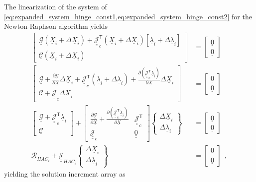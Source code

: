 \documentclass[12pt,a4paper,oneside,english]{abntex2} %
\newcommand{\vect}[1]{\underline{#1}}
\newcommand{\del}[2]{\frac{\partial#1}{\partial#2}}
\def\tens#1{\underline{\underline{#1}}}
\def\lb{\left[}
\def\rb{\right]}
\def\lp{\left(}
\def\rp{\right)}
\def\T{\mathsf{T}}
\def\zv{\vect{0}}
\def\Sys{\mathcal{\vect{G}}}
\def\X{\vect{X}}
\def\Xi{\X_i}
\def\JacSys{\tens{\mathcal{J}}}
\def\lambvi{\vect{\lambda}_i}
\begin{document}
The linearization of the system of \cref{eq:expanded_system_hinge_const1,eq:expanded_system_hinge_const2} for the Newton-Raphson algorithm yields
\begin{align}
    \begin{bmatrix} 
    \Sys\lp\Xi+\Delta\Xi\rp + \JacSys_c^\T\lp\Xi+\Delta\Xi\rp \lb\lambvi+\Delta\lambvi\rb \\ \mathcal{\vect{C}}\lp\Xi+\Delta\Xi\rp \end{bmatrix} &= \begin{bmatrix} \zv \\ \zv \end{bmatrix} \nonumber 
    \\
    \begin{bmatrix} \Sys + \del{\Sys}{\X}\Delta\Xi + \JacSys_c^\T \lp\lambvi + \Delta\lambvi\rp + \del{\lp\JacSys_c^\T\lambvi\rp}{\X} \Delta\Xi \\ \mathcal{\vect{C}} + \JacSys_c\Delta\Xi \end{bmatrix} &= \begin{bmatrix} \zv \\ \zv \end{bmatrix} \nonumber 
    \\
    \begin{bmatrix} \Sys + \JacSys_c^\T \lambvi \\ \mathcal{\vect{C}} \end{bmatrix} + \begin{bmatrix} \del{\Sys}{\X} +  \del{\lp\JacSys_c^\T\lambvi\rp}{\X} & \JacSys_c^\T \\ \JacSys_c & \tens{0} \end{bmatrix} \begin{Bmatrix} \Delta\Xi \\ \Delta\lambvi \end{Bmatrix} &= \begin{bmatrix} \zv \\ \zv \end{bmatrix} \nonumber 
    \\
    \vect{\mathcal{R}}_{{HAC}_i} + \tens{\mathcal{J}}_{{HAC}_i} \begin{Bmatrix} \Delta\Xi \\ \Delta\lambvi \end{Bmatrix} &= \begin{bmatrix} \zv \\ \zv \end{bmatrix} \ \ ,
    \label{eq:sys_constrained}
\end{align}
yielding the solution increment array as
\end{document}
